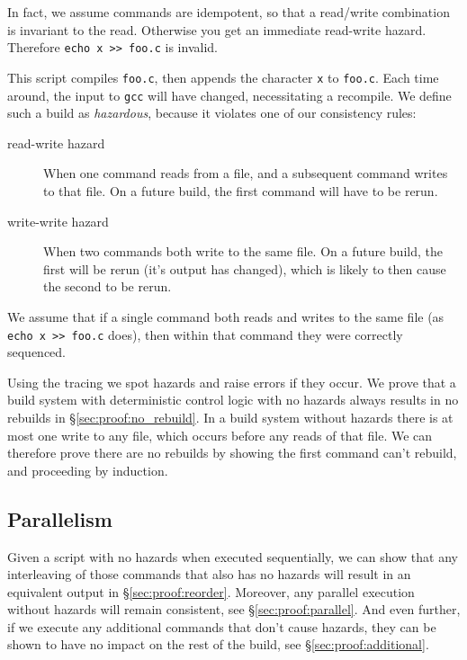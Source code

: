 In fact, we assume commands are idempotent, so that a read/write combination is invariant to the read. Otherwise you get an immediate read-write hazard. Therefore \texttt{echo x >> foo.c} is invalid.

This script compiles \texttt{foo.c}, then appends the character \texttt{x} to \texttt{foo.c}. Each time around, the input to \texttt{gcc} will have changed, necessitating a recompile. We define such a build as \emph{hazardous}, because it violates one of our consistency rules:

\begin{description}
\item[read-write hazard] When one command reads from a file, and a subsequent command writes to that file. On a future build, the first command will have to be rerun.
\item[write-write hazard] When two commands both write to the same file. On a future build, the first will be rerun (it's output has changed), which is likely to then cause the second to be rerun.
\end{description}

We assume that if a single command both reads and writes to the same file (as \texttt{echo x >> foo.c} does), then within that command they were correctly sequenced.

Using the tracing we spot hazards and raise errors if they occur. We prove that a build system with deterministic control logic with no hazards always results in no rebuilds in \S\ref{sec:proof:no_rebuild}. In a build system without hazards there is at most one write to any file, which occurs before any reads of that file. We can therefore prove there are no rebuilds by showing the first command can't rebuild, and proceeding by induction.

\subsection{Parallelism}

Given a script with no hazards when executed sequentially, we can show that any interleaving of those commands that also has no hazards will result in an equivalent output in \S\ref{sec:proof:reorder}. Moreover, any parallel execution without hazards will remain consistent, see \S\ref{sec:proof:parallel}. And even further, if we execute any additional commands that don't cause hazards, they can be shown to have no impact on the rest of the build, see \S\ref{sec:proof:additional}.

